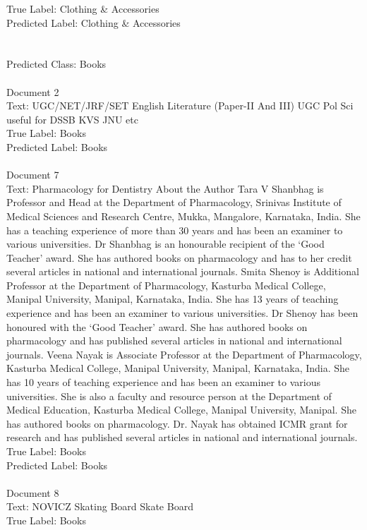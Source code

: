 \documentclass[a4paper,12pt]{article}
\begin{document}
{True Label: Clothing \& Accessories\\
Predicted Label: Clothing \& Accessories\\
\\\\Predicted Class: Books\\
\\Document 2\\
Text: UGC/NET/JRF/SET English Literature (Paper-II And III) UGC Pol Sci useful for DSSB KVS JNU etc\\
True Label: Books\\
Predicted Label: Books\\
\\Document 7\\
Text: Pharmacology for Dentistry About the Author Tara V Shanbhag is Professor and Head at the Department of Pharmacology, Srinivas Institute of Medical Sciences and Research Centre, Mukka, Mangalore, Karnataka, India. She has a teaching experience of more than 30 years and has been an examiner to various universities. Dr Shanbhag is an honourable recipient of the ‘Good Teacher’ award. She has authored books on pharmacology and has to her credit several articles in national and international journals. Smita Shenoy is Additional Professor at the Department of Pharmacology, Kasturba Medical College, Manipal University, Manipal, Karnataka, India. She has 13 years of teaching experience and has been an examiner to various universities. Dr Shenoy has been honoured with the ‘Good Teacher’ award. She has authored books on pharmacology and has published several articles in national and international journals. Veena Nayak is Associate Professor at the Department of Pharmacology, Kasturba Medical College, Manipal University, Manipal, Karnataka, India. She has 10 years of teaching experience and has been an examiner to various universities. She is also a faculty and resource person at the Department of Medical Education, Kasturba Medical College, Manipal University, Manipal. She has authored books on pharmacology. Dr. Nayak has obtained ICMR grant for research and has published several articles in national and international journals.\\
True Label: Books\\
Predicted Label: Books\\
\\Document 8\\
Text: NOVICZ Skating Board Skate Board\\
True Label: Books\\
}
\end{document}
